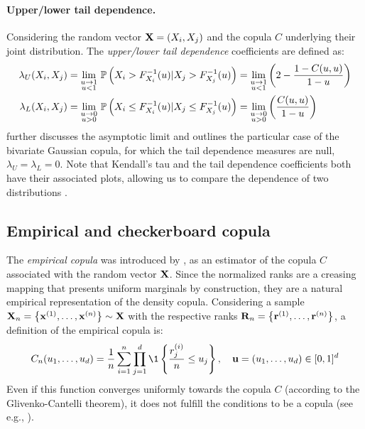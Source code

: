 \paragraph{Upper/lower tail dependence.} 
Considering the random vector $\bX = (X_i, X_j)$ and the copula $C$ underlying their joint distribution. 
The \textit{upper/lower tail dependence} coefficients are defined as: 
\begin{subequations}
    \begin{align}
        \lambda_U(X_i, X_j) &= \lim_{\substack{u \rightarrow 1 \\ u<1}} \, \P\left(X_i > F_{X_i}^{-1}(u) | X_j > F_{X_j}^{-1}(u)\right) =       \lim_{\substack{u \rightarrow 1 \\ u<1}} \left(2 - \frac{1 - C(u, u)}{1 - u}\right)\\
        \lambda_L(X_i, X_j) &= \lim_{\substack{u \rightarrow 0 \\ u>0}} \, \P\left(X_i \leq F_{X_i}^{-1}(u) | X_j \leq F_{X_j}^{-1}(u)\right) = \lim_{\substack{u \rightarrow 0 \\ u>0}} \left(\frac{C(u, u)}{1 - u}\right) 
    \end{align}
\end{subequations}
\cite{joe_2014} further discusses the asymptotic limit and outlines the particular case of the bivariate Gaussian copula, for which the tail dependence measures are null, $\lambda_U = \lambda_L = 0$.
Note that Kendall's tau and the tail dependence coefficients both have their associated plots, allowing us to compare the dependence of two distributions .

\subsection{Empirical and checkerboard copula}

The \textit{empirical copula} was introduced by \citet{deheuvels_1979_empirical_copula}, as an estimator of the copula $C$ associated with the random vector $\bX$. 
Since the normalized ranks are a creasing mapping that presents uniform marginals by construction, they are a natural empirical representation of the density copula. 
Considering a sample $\bX_n = \left\{\bx^{(1)}, \dots, \bx^{(n)}\right\} \sim \bX$ with the respective ranks $\bR_n = \left\{\br^{(1)}, \dots, \br^{(n)}\right\}$, a definition of the empirical copula is: 
\begin{equation}
    C_n(u_1, \dots, u_d) = \frac1n \sum_{i=1}^{n} \prod_{j=1}^{d} \1 \left\{ \frac{r_j^{(i)}}{n} \leq u_j \right\}, \quad  \bu = (u_1, \dots, u_d) \in [0, 1]^d
    \label{eq:empirical_copula}
\end{equation}
Even if this function converges uniformly towards the copula $C$ (according to the Glivenko-Cantelli theorem), it does not fulfill the conditions to be a copula (see e.g., \citealp{gonzalez_2021_checkerboard_copula}). 


